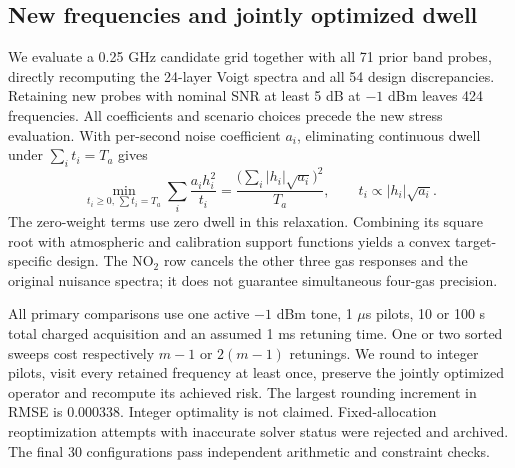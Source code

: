 \subsection{New frequencies and jointly optimized dwell}
We evaluate a 0.25 GHz candidate grid together with all 71 prior band probes, directly recomputing the 24-layer Voigt spectra and all 54 design discrepancies. Retaining new probes with nominal SNR at least 5 dB at $-1$ dBm leaves 424 frequencies. All coefficients and scenario choices precede the new stress evaluation. With per-second noise coefficient $a_i$, eliminating continuous dwell under $\sum_i t_i=T_a$ gives
\begin{equation}
\min_{t_i\ge0,\,\sum t_i=T_a}\sum_i\frac{a_i h_i^2}{t_i}
=\frac{\big(\sum_i|h_i|\sqrt{a_i}\big)^2}{T_a},
\qquad t_i\propto|h_i|\sqrt{a_i}.
\end{equation}
The zero-weight terms use zero dwell in this relaxation. Combining its square root with atmospheric and calibration support functions yields a convex target-specific design. The NO$_2$ row cancels the other three gas responses and the original nuisance spectra; it does not guarantee simultaneous four-gas precision.

All primary comparisons use one active $-1$ dBm tone, 1 $\mu$s pilots, 10 or 100 s total charged acquisition and an assumed 1 ms retuning time. One or two sorted sweeps cost respectively $m-1$ or $2(m-1)$ retunings. We round to integer pilots, visit every retained frequency at least once, preserve the jointly optimized operator and recompute its achieved risk. The largest rounding increment in RMSE is 0.000338. Integer optimality is not claimed. Fixed-allocation reoptimization attempts with inaccurate solver status were rejected and archived. The final 30 configurations pass independent arithmetic and constraint checks.

